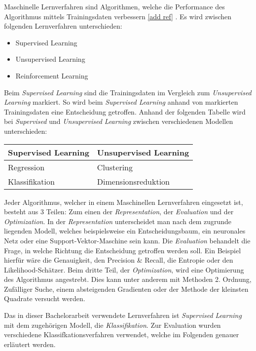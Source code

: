 Maschinelle Lernverfahren sind Algorithmen, welche die Performance des Algorithmus mittels Trainingsdaten verbessern \ref{add ref} . 
Es wird zwischen folgenden Lernverfahren unterschieden:
\begin{itemize}
    \item Supervised Learning
    \item Unsupervised Learning
    \item Reinforcement Learning
\end{itemize}
Beim \textit{Supervised Learning} sind die Trainingsdaten im Vergleich zum \textit{Unsupervised Learning} markiert. 
So wird beim \textit{Supervised Learning} anhand von markierten Trainingsdaten eine Entscheidung getroffen. 
Anhand der folgenden Tabelle wird bei \textit{Supervised} und \textit{Unsupervised Learning} zwischen verschiedenen Modellen unterschieden:
\begin{center}
    \begin{tabular}{ | l | l | }
      \hline
      \textbf{Supervised Learning} & \textbf{Unsupervised Learning} \\ \hline
      \hline
      Regression & Clustering \\ \hline
      Klassifikation & Dimensionsreduktion \\
      \hline
    \end{tabular}
\end{center}

Jeder Algorithmus, welcher in einem Maschinellen Lernverfahren eingesetzt ist, besteht aus 3 Teilen: Zum einen der \textit{Representation}, der \textit{Evaluation} und der \textit{Optimization}. 
In der \textit{Representation} unterscheidet man nach dem zugrunde liegenden Modell, welches beispielsweise ein Entscheidungsbaum, ein neuronales Netz oder eine Support-Vektor-Maschine sein kann.
Die \textit{Evaluation} behandelt die Frage, in welche Richtung die Entscheidung getroffen werden soll. 
Ein Beispiel hierfür wäre die Genauigkeit, den Precision \& Recall, die Entropie oder den Likelihood-Schätzer.
Beim dritte Teil, der \textit{Optimization}, wird eine Optimierung des Algorithmus angestrebt. 
Dies kann unter anderem mit Methoden 2. Ordnung, Zufälliger Suche, einem absteigenden Gradienten oder der Methode der kleinsten Quadrate versucht werden.

Das in dieser Bachelorarbeit verwendete Lernverfahren ist \textit{Supervised Learning} mit dem zugehörigen Modell, die \textit{Klassifikation}.
Zur Evaluation wurden verschiedene Klassifkationsverfahren verwendet, welche im Folgenden genauer erläutert werden.

